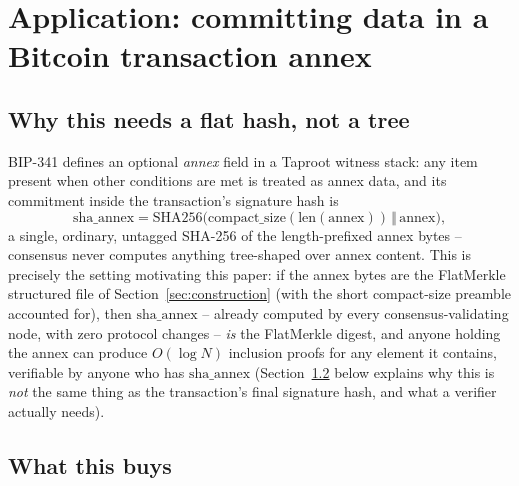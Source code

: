 \section{Application: committing data in a Bitcoin transaction annex}
\label{sec:bitcoin-annex}

\subsection{Why this needs a flat hash, not a tree}

BIP-341 \citep{bip341} defines an optional \emph{annex} field in a Taproot
witness stack: any item present when other conditions are met is treated as
annex data, and its commitment inside the transaction's signature hash is
\begin{equation}
\mathrm{sha\_annex} = \mathrm{SHA256}\big(\mathrm{compact\_size}(\mathrm{len}(\mathrm{annex})) \,\Vert\, \mathrm{annex}\big),
\end{equation}
a single, ordinary, untagged SHA-256 of the length-prefixed annex bytes --
consensus never computes anything tree-shaped over annex content. This is
precisely the setting motivating this paper: if the annex bytes are the
FlatMerkle structured file of Section~\ref{sec:construction} (with the
short compact-size preamble accounted for), then $\mathrm{sha\_annex}$ --
already computed by every consensus-validating node, with zero protocol
changes -- \emph{is} the FlatMerkle digest, and anyone holding the annex
can produce $O(\log N)$ inclusion proofs for any element it contains,
verifiable by anyone who has $\mathrm{sha\_annex}$ (Section~\ref{sec:annex-buys}
below explains why this is \emph{not} the same thing as the transaction's
final signature hash, and what a verifier actually needs).

\subsection{What this buys}
\label{sec:annex-buys}


